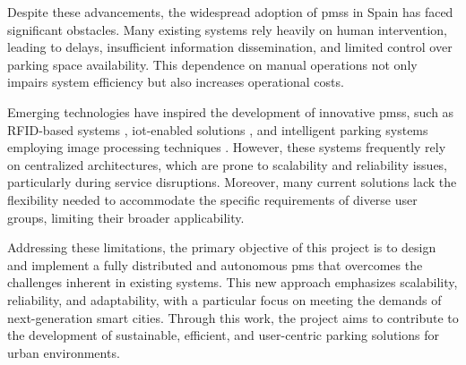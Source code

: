 Despite these advancements, the widespread adoption of \glspl{pms} in Spain has faced significant obstacles. Many existing systems rely heavily on human intervention, leading to delays, insufficient information dissemination, and limited control over parking space availability. This dependence on manual operations not only impairs system efficiency but also increases operational costs.

Emerging technologies have inspired the development of innovative \glspl{pms}, such as RFID-based systems \autocite{rfid_smart_parking_management_system}, \gls{iot}-enabled solutions \autocite{development_smart_parking_management_system}, and intelligent parking systems employing image processing techniques \autocite{intelligent_parking_system_image_processing}. However, these systems frequently rely on centralized architectures, which are prone to scalability and reliability issues, particularly during service disruptions. Moreover, many current solutions lack the flexibility needed to accommodate the specific requirements of diverse user groups, limiting their broader applicability.

Addressing these limitations, the primary objective of this project is to design and implement a fully distributed and autonomous \gls{pms} that overcomes the challenges inherent in existing systems. This new approach emphasizes scalability, reliability, and adaptability, with a particular focus on meeting the demands of next-generation smart cities. Through this work, the project aims to contribute to the development of sustainable, efficient, and user-centric parking solutions for urban environments.

